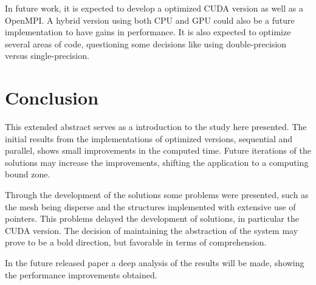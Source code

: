 \documentclass[a4paper,10pt,openright,openbib,twocolumn]{article}
\begin{document}
In future work, it is expected to develop a optimized CUDA version as well as a OpenMPI. A hybrid version using both CPU and GPU could also be a future implementation to have gains in performance. It is also expected to optimize several areas of code, questioning some decisions like using double-precision versus single-precision. 

\section{Conclusion}

This extended abstract serves as a introduction to the study here presented. The initial results from the implementations of optimized versions, sequential and parallel, shows small improvements in the computed time. Future iterations of the solutions may increase the improvements, shifting the application to a computing bound zone.

Through the development of the solutions some problems were presented, such as the mesh being disperse and the structures implemented with  extensive use of pointers. This problems delayed the development of solutions, in particular the CUDA version. The decision of maintaining the abstraction of the system may prove to be a bold direction, but favorable in terms of comprehension.

In the future released paper a deep analysis of the results will be made, showing the performance improvements obtained.
\end{document}
